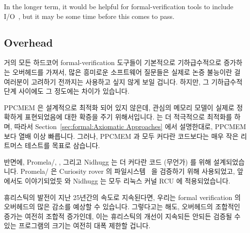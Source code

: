 In the longer term, it would be helpful for formal-verification
tools to include I/O~\cite{PaulEMcKenney2016LinuxKernelMMIO},
but it may be some time before this comes to pass.
\fi

\subsection{Overhead}
\label{sec:future:Overhead}

거의 모든 하드코어 formal-verification 도구들이 기본적으로 기하급수적으로
증가하는 오버헤드를 가져서, 많은 흥미로운 소프트웨어 질문들은 실제로 논증
불능이란 걸 여러분이 고려하기 전까지는 사용하고 싶지 않게 보일 겁니다.
하지만, 그 기하급수적 단계 사이에도 그 정도에는 차이가 있습니다.

PPCMEM 은 설계적으로 최적화 되어 있지 않은데, 관심의 메모리 모델이 실제로
정확하게 표현되었음에 대한 확증을 주기 위해서입니다.
 는 더 적극적으로 최적화를 하며, 따라서
Section~\ref{sec:formal:Axiomatic Approaches} 에서 설명한대로, PPCMEM 보다 열배
이상 빠릅니다.
그러나, PPCMEM 과  모두 커다란 코드보다는 매우 작은 리트머스 테스트를
목표로 삼습니다.
\iffalse

Almost all hard-core formal-verification tools are exponential
in nature, which might seem discouraging until you consider that
many of the most interesting software questions are in fact undecidable.
However, there are differences in degree, even among exponentials.

PPCMEM by design is unoptimized, in order to provide greater assurance
that the memory models of interest are in fact accurately represented.
The \co{herd} tool optimizes more aggressively, and so as described in
Section~\ref{sec:formal:Axiomatic Approaches}, is orders of magnitude
faster than PPCMEM.
Nevertheless, both PPCMEM and \co{herd} target very small litmus tests
rather than larger bodies of code.
\fi

반면에, Promela/, , 그리고 Nidhugg 는 더 커다란 코드 (무언가)
를 위해 설계되었습니다.
Promela/ 은 Curiosity rover 의
파일시스템~\cite{DBLP:journals/amai/GroceHHJX14} 을 검증하기 위해 사용되었고,
앞에서도 이야기되었듯  와 Nidhugg 는 모두 리눅스 커널 RCU 에
적용되었습니다.

휴리스틱의 발전이 지난 25년간의 속도로 지속된다면, 우리는 formal verification
의 오버헤드의 많은 감소를 예상할 수 있습니다.
그렇다고는 해도, 오버헤드의 조합적인 증가는 여전히 조합적 증가인데, 이는
휴리스틱의 개선이 지속되든 안되든 검증될 수 있는 프로그램의 크기는 여전히 대폭
제한할 겁니다.
\iffalse

